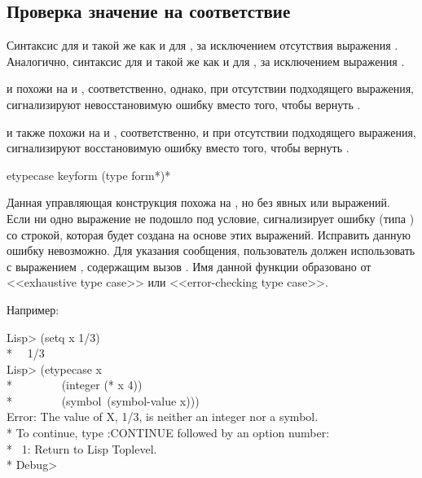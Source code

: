 \subsection{Проверка значение на соответствие}
\label{EXHAUSTIVE-CASE-ANALYSIS-CONDITIONS}

Синтаксис для  и  такой же как и для
, за исключением отсутствия выражения . Аналогично,
синтаксис для  и  такой же как и для , за
исключением выражения .

 и  похожи на  и ,
соответственно, однако, при отсутствии подходящего выражения, сигнализируют
невосстановимую ошибку вместо того, чтобы вернуть .

 и  также похожи на  и ,
соответственно, и при отсутствии подходящего выражения, сигнализируют
восстановимую ошибку вместо того, чтобы вернуть .

\begin{defmac}
etypecase keyform {(type {form}*)}*

Данная управляющая конструкция похожа на , но без явных
 или  выражений. Если ни одно выражение не подошло под
условие,  сигнализирует ошибку (типа ) со строкой,
которая будет создана на основе этих выражений. Исправить данную ошибку
невозможно. Для указания сообщения, пользователь должен использовать
 с выражением , содержащим вызов . Имя
данной функции образовано от <<exhaustive type case>> или <<error-checking type
case>>.

Например:
\begin{lisp}
Lisp> (setq x 1/3) \\*
~\EV\ 1/3 \\
Lisp> (etypecase x \\*
~~~~~~~~(integer (* x 4)) \\*
~~~~~~~~(symbol~(symbol-value x))) \\
Error: The value of X, 1/3, is neither an integer nor a symbol. \\*
To continue, type :CONTINUE followed by an option number: \\*
~1: Return to Lisp Toplevel. \\*
Debug>
\end{lisp}
\end{defmac}

